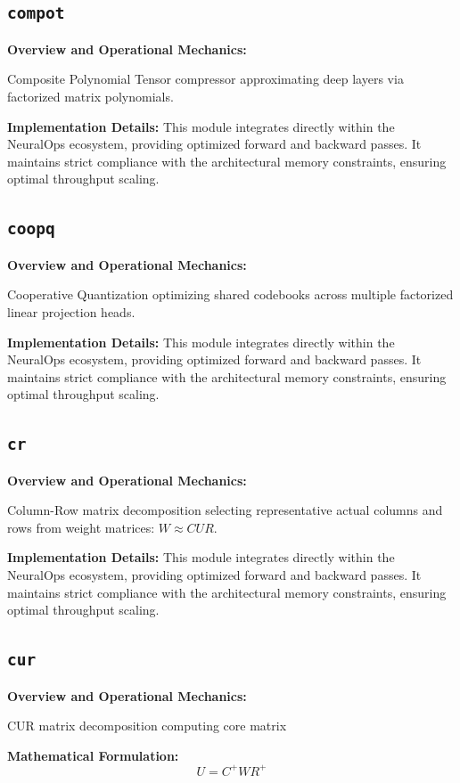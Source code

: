 \documentclass[10pt,twocolumn,letterpaper]{article}
\begin{document}
\subsection{\texttt{compot}}
\textbf{Overview and Operational Mechanics:}

Composite Polynomial Tensor compressor approximating deep layers via factorized matrix polynomials.

\textbf{Implementation Details:}
This module integrates directly within the NeuralOps ecosystem, providing optimized forward and backward passes. It maintains strict compliance with the architectural memory constraints, ensuring optimal throughput scaling.

\subsection{\texttt{coopq}}
\textbf{Overview and Operational Mechanics:}

Cooperative Quantization optimizing shared codebooks across multiple factorized linear projection heads.

\textbf{Implementation Details:}
This module integrates directly within the NeuralOps ecosystem, providing optimized forward and backward passes. It maintains strict compliance with the architectural memory constraints, ensuring optimal throughput scaling.

\subsection{\texttt{cr}}
\textbf{Overview and Operational Mechanics:}

Column-Row matrix decomposition selecting representative actual columns and rows from weight matrices: $W \approx C U R$.

\textbf{Implementation Details:}
This module integrates directly within the NeuralOps ecosystem, providing optimized forward and backward passes. It maintains strict compliance with the architectural memory constraints, ensuring optimal throughput scaling.

\subsection{\texttt{cur}}
\textbf{Overview and Operational Mechanics:}

CUR matrix decomposition computing core matrix

\textbf{Mathematical Formulation:}
\begin{equation}
U = C^+ W R^+
\end{equation}
\end{document}
